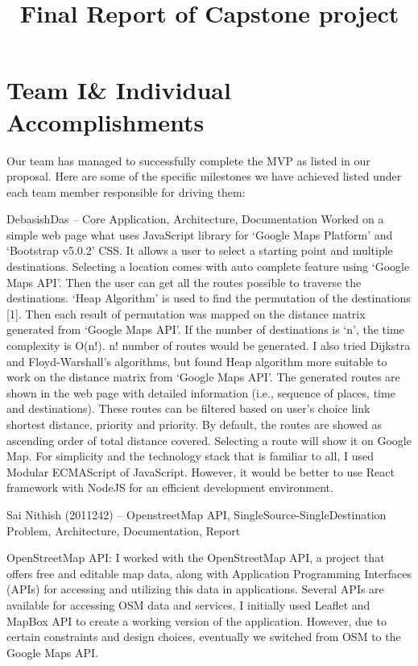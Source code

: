 \documentclass{article}
\title{Final Report of Capstone project}
\begin{document}
\maketitle

\section{Team I\& Individual Accomplishments}  
Our team has managed to successfully complete the MVP as listed in our proposal. Here are some of the specific milestones we have achieved listed under each team member responsible for driving them: 

DebasishDas  – Core Application, Architecture, Documentation 
Worked on a simple web page what uses JavaScript library for ‘Google Maps Platform’ and ‘Bootstrap v5.0.2’ CSS. It allows a user to select a starting point and multiple destinations. Selecting a location comes with auto complete feature using ‘Google Maps API’. Then the user can get all the routes possible to traverse the destinations. ‘Heap Algorithm’ is used to find the permutation of the destinations [1]. Then each result of permutation was mapped on the distance matrix generated from ‘Google Maps API’. If the number of destinations is ‘n’, the time complexity is O(n!). n! number of routes would be generated.  I also tried Dijkstra and Floyd-Warshall’s algorithms, but found Heap algorithm more suitable to work on the distance matrix from ‘Google Maps API’. The generated routes are shown in the web page with detailed information (i.e., sequence of places, time and destinations). These routes can be filtered based on user’s choice link shortest distance, priority and priority. By default, the routes are showed as ascending order of total distance covered. Selecting a route will show it on Google Map. For simplicity and the technology stack that is familiar to all, I used Modular ECMAScript of JavaScript. However, it would be better to use React framework with NodeJS for an efficient development environment. 

Sai Nithish (2011242) – OpenstreetMap API, SingleSource-SingleDestination Problem, Architecture, Documentation, Report 

OpenStreetMap API:
I worked with the OpenStreetMap API, a project that offers free and editable map data, along with Application Programming Interfaces (APIs) for accessing and utilizing this data in applications. Several APIs are available for accessing OSM data and services. I initially used Leaflet and MapBox API to create a working version of the application. However, due to certain constraints and design choices, eventually we switched from OSM to the Google Maps API.
\end{document}
